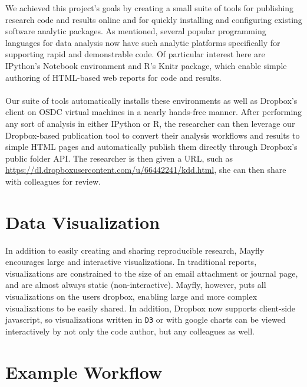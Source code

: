 \documentclass[10pt,a4]{article}
\begin{document}
We achieved this project's goals by creating a small suite of tools for publishing research code and results online and for quickly installing and configuring existing software analytic packages.
As mentioned, several popular programming languages for data analysis now have such analytic platforms specifically for supporting rapid and demonstrable code.
Of particular interest here are IPython's Notebook environment and R's Knitr package, which enable simple authoring of HTML-based web reports for code and results. \\ \\
Our suite of tools automatically installs these environments as well as Dropbox's client on OSDC virtual machines in a nearly hands-free manner.
After performing any sort of analysis in either IPython or R, the researcher can then leverage our Dropbox-based publication tool to convert their analysis workflows and results to simple HTML pages and automatically publish them directly through Dropbox's public folder API.
The researcher is then given a URL, such as \url{https://dl.dropboxusercontent.com/u/66442241/kdd.html}, she can then share with colleagues for review.


\section{Data Visualization}
In addition to easily creating and sharing reproducible research, Mayfly encourages large and interactive visualizations. In traditional reports, visualizations are constrained to the size of an email attachment or journal page, and are almost always static (non-interactive). 
Mayfly, however, puts all visualizations on the users dropbox, enabling large and more complex visualizations to be easily shared. In addition, Dropbox now supports client-side javascript, so visualizations written in \texttt{D3} or with google charts can be viewed interactively by not only the code author, but any colleagues as well. 


\section{Example Workflow}
\end{document}
